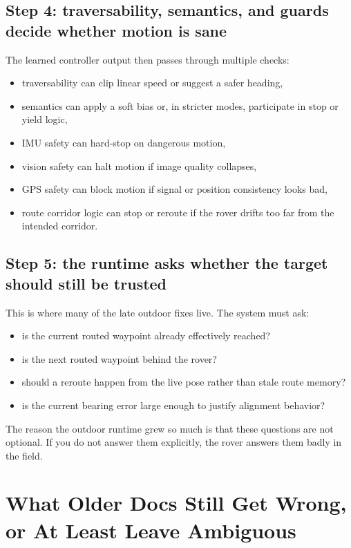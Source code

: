 \documentclass[11pt]{article}
\begin{document}
\subsection{Step 4: traversability, semantics, and guards decide whether motion is sane}

The learned controller output then passes through multiple checks:

\begin{itemize}[nosep]
  \item traversability can clip linear speed or suggest a safer heading,
  \item semantics can apply a soft bias or, in stricter modes, participate in stop
  or yield logic,
  \item IMU safety can hard-stop on dangerous motion,
  \item vision safety can halt motion if image quality collapses,
  \item GPS safety can block motion if signal or position consistency looks bad,
  \item route corridor logic can stop or reroute if the rover drifts too far from
  the intended corridor.
\end{itemize}

\subsection{Step 5: the runtime asks whether the target should still be trusted}

This is where many of the late outdoor fixes live. The system must ask:

\begin{itemize}[nosep]
  \item is the current routed waypoint already effectively reached?
  \item is the next routed waypoint behind the rover?
  \item should a reroute happen from the live pose rather than stale route memory?
  \item is the current bearing error large enough to justify alignment behavior?
\end{itemize}

The reason the outdoor runtime grew so much is that these questions are not
optional. If you do not answer them explicitly, the rover answers them badly in the
field.

\section{What Older Docs Still Get Wrong, or At Least Leave Ambiguous}
\end{document}
